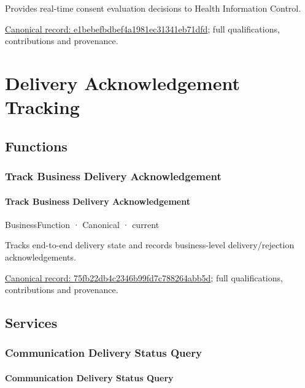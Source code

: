 Provides real-time consent evaluation decisions to Health Information Control.


{\footnotesize \href{../../../../continuum/business/business-service/e1bebefbdbef4a1981ec31341eb71dfd.md}{Canonical record: e1bebefbdbef4a1981ec31341eb71dfd}; full qualifications, contributions and provenance.}\par
\section{Delivery Acknowledgement Tracking}

\subsection{Functions}

\subsubsection{Track Business Delivery Acknowledgement}

\paragraph{Track Business Delivery Acknowledgement}

\label{element:75fb22db4c2346b99fd7c788264abb5d}
{\small BusinessFunction · Canonical · current}\par

Tracks end-to-end delivery state and records business-level delivery/rejection acknowledgements.


{\footnotesize \href{../../../../continuum/business/business-function/75fb22db4c2346b99fd7c788264abb5d.md}{Canonical record: 75fb22db4c2346b99fd7c788264abb5d}; full qualifications, contributions and provenance.}\par
\subsection{Services}

\subsubsection{Communication Delivery Status Query}

\paragraph{Communication Delivery Status Query}

